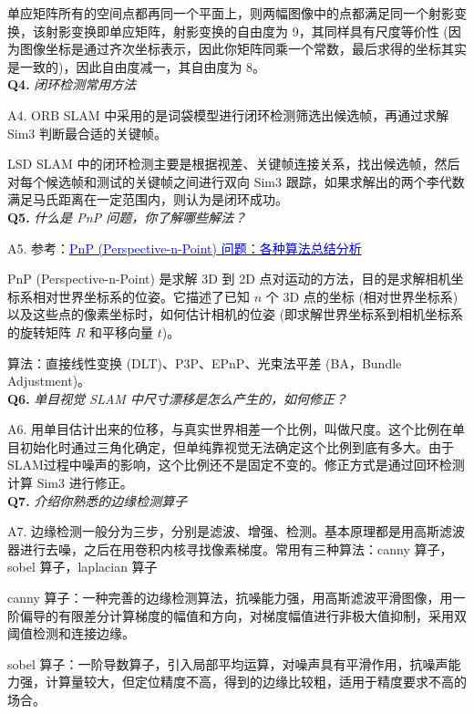 \documentclass[cn,10pt,math=newtx,citestyle=gb7714-2015,bibstyle=gb7714-2015]{elegantbook}
\begin{document}
单应矩阵所有的空间点都再同一个平面上，则两幅图像中的点都满足同一个射影变换，该射影变换即单应矩阵，射影变换的自由度为 9，其同样具有尺度等价性 (因为图像坐标是通过齐次坐标表示，因此你矩阵同乘一个常数，最后求得的坐标其实是一致的)，因此自由度减一，其自由度为 8。\\


\textbf{Q4.} \textit{闭环检测常用方法}

A4. ORB SLAM 中采用的是词袋模型进行闭环检测筛选出候选帧，再通过求解 Sim3 判断最合适的关键帧。

LSD SLAM 中的闭环检测主要是根据视差、关键帧连接关系，找出候选帧，然后对每个候选帧和测试的关键帧之间进行双向 Sim3 跟踪，如果求解出的两个李代数满足马氏距离在一定范围内，则认为是闭环成功。\\


\textbf{Q5.} \textit{什么是 PnP 问题，你了解哪些解法？}

A5. 参考：\hyperlink{https://zhuanlan.zhihu.com/p/399140251}{\textcolor{blue}{PnP (Perspective-n-Point) 问题：各种算法总结分析}} 

PnP (Perspective-n-Point) 是求解 3D 到 2D 点对运动的方法，目的是求解相机坐标系相对世界坐标系的位姿。它描述了已知 $n$ 个 3D 点的坐标 (相对世界坐标系) 以及这些点的像素坐标时，如何估计相机的位姿 (即求解世界坐标系到相机坐标系的旋转矩阵 $R$ 和平移向量 $t$)。

算法：直接线性变换 (DLT)、P3P、EPnP、光束法平差 (BA，Bundle Adjustment)。\\


\textbf{Q6.} \textit{单目视觉 SLAM 中尺寸漂移是怎么产生的，如何修正？}

A6. 用单目估计出来的位移，与真实世界相差一个比例，叫做尺度。这个比例在单目初始化时通过三角化确定，但单纯靠视觉无法确定这个比例到底有多大。由于SLAM过程中噪声的影响，这个比例还不是固定不变的。修正方式是通过回环检测计算 Sim3 进行修正。\\


\textbf{Q7.} \textit{介绍你熟悉的边缘检测算子}

A7. 边缘检测一般分为三步，分别是滤波、增强、检测。基本原理都是用高斯滤波器进行去噪，之后在用卷积内核寻找像素梯度。常用有三种算法：canny 算子，sobel 算子，laplacian 算子

canny 算子：一种完善的边缘检测算法，抗噪能力强，用高斯滤波平滑图像，用一阶偏导的有限差分计算梯度的幅值和方向，对梯度幅值进行非极大值抑制，采用双阈值检测和连接边缘。

sobel 算子：一阶导数算子，引入局部平均运算，对噪声具有平滑作用，抗噪声能力强，计算量较大，但定位精度不高，得到的边缘比较粗，适用于精度要求不高的场合。
\end{document}
